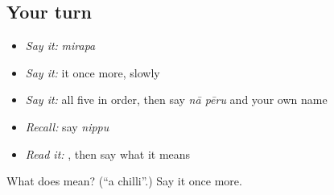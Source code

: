 \subsection*{Your turn}
\begin{itemize}
\raggedright
  \item \emph{Say it:} \emph{mirapa}
  \item \emph{Say it:} it once more, slowly
  \item \emph{Say it:} all five in order, then say \emph{nā pēru} and your own name
  \item \emph{Recall:} say \emph{nippu}
  \item \emph{Read it:} \textbf{}, then say what it means
\end{itemize}

\begin{tcolorbox}[breakable,colback=teal!4,colframe=teal!35!black,title={Before you move on}]
What does  mean? (\textquotedblleft{}a chilli\textquotedblright{}.) Say it once more.
\end{tcolorbox}
